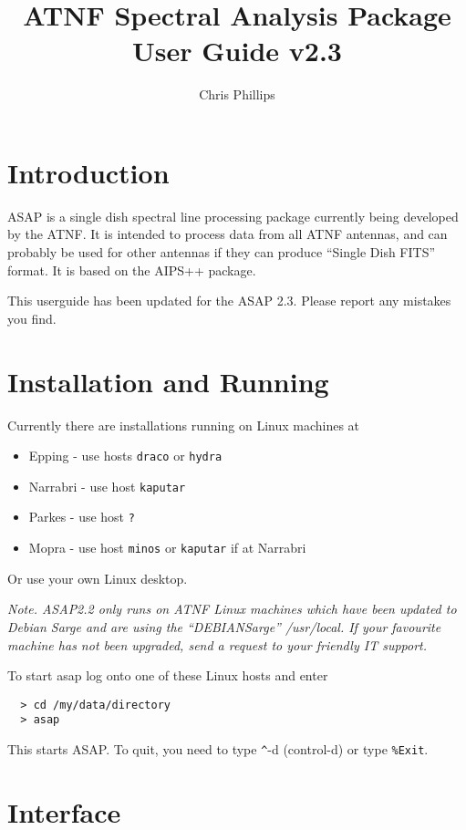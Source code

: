 \documentclass[11pt]{article}
\title{ATNF Spectral Analysis Package\\User Guide v2.3 }
\author{Chris Phillips}
\newcommand{\cmd}[1]{{\tt #1}}
\begin{document}
\maketitle

\section{Introduction}

ASAP is a single dish spectral line processing package currently being
developed by the ATNF. It is intended to process data from all ATNF
antennas, and can probably be used for other antennas if they can
produce ``Single Dish FITS'' format. It is based on the AIPS++
package.

This userguide has been updated for the ASAP 2.3. Please report any
mistakes you find.

\section{Installation and Running}

Currently there are installations running on Linux machines at

\begin{itemize}
\item Epping - use hosts {\tt draco} or {\tt hydra}
\item Narrabri - use host {\tt kaputar}
\item Parkes - use host {\tt ?}
\item Mopra - use host {\tt minos} or {\tt kaputar} if at Narrabri
\end{itemize}

Or use your own Linux desktop.

{\em Note. ASAP2.2 only runs on ATNF Linux machines which have been
updated to Debian Sarge and are using the ``DEBIANSarge''
/usr/local. If your favourite machine has not been upgraded, send a
request to your friendly IT support.}

To start asap log onto one of these Linux hosts and enter

\begin{verbatim}
  > cd /my/data/directory
  > asap
\end{verbatim}

This starts ASAP. To quit, you need to type \verb+^+-d (control-d) or
type \cmd{\%Exit}.

\section{Interface}
\end{document}
